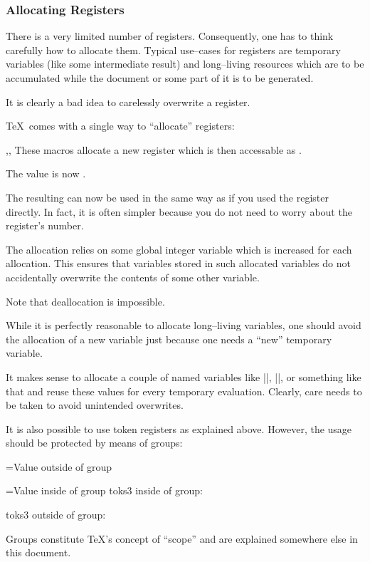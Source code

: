 \documentclass[a4paper]{ltxdoc}
\begin{document}
\subsubsection{Allocating Registers}
There is a very limited number of registers. Consequently, one has to think carefully how to allocate them. Typical use--cases for registers are temporary variables (like some intermediate result) and long--living resources which are to be accumulated while the document or some part of it is to be generated.

It is clearly a bad idea to carelessly overwrite a register.

\TeX\ comes with a single way to ``allocate'' registers:
\begin{commandlist}{\newdimen{},\newcount{},\newtoks{}}
	These macros allocate a new register which is then accessable as .
\begin{codeexample}[]
\newdimen\variable

\variable=42pt

The value is now \the\variable.
\end{codeexample}

	The resulting  can now be used in the same way as if you used the register directly. In fact, it is often simpler because you do not need to worry about the register's number.

	The allocation relies on some global integer variable which is increased for each allocation. This ensures that variables stored in such allocated variables do not accidentally overwrite the contents of some other variable.

	Note that deallocation is impossible.
\end{commandlist}
	
While it is perfectly reasonable to allocate long--living variables, one should avoid the allocation of a new variable just because one needs a ``new'' temporary variable.

It makes sense to allocate a couple of named variables like |\tempa|, |\tempb|, or something like that and reuse these values for every temporary evaluation. Clearly, care needs to be taken to avoid unintended overwrites.

It is also possible to use token registers as explained above. However, the usage should be protected by means of groups:
\begin{codeexample}[]
={Value outside of group}

\begingroup
{}={Value inside of group}
toks3 inside of group: \the{}
\endgroup

toks3 outside of group: \the{}
\end{codeexample}
	Groups constitute \TeX's concept of ``scope'' and are explained somewhere else in this document.
\end{document}
